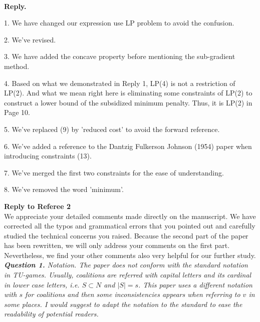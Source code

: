 \documentclass[11pt]{article}
\begin{document}
\\[2mm]

\noindent \textbf{Reply.}

1. We have changed our expression use LP problem to avoid the confusion.

2. We've revised.

3. We have added the concave property before mentioning the sub-gradient method.

4. Based on what we demonstrated in Reply 1, LP(4) is not a restriction of LP(2). And what we mean right here is eliminating some constraints of LP(2) to construct a lower bound of the subsidized minimum penalty. Thus, it is LP(2) in Page 10.

5. We've replaced (9) by 'reduced cost' to avoid the forward reference.

6. We've added a reference to the Dantzig Fulkerson Johnson (1954) paper when introducing constraints (13).

7. We've merged the first two constraints for the ease of understanding.

8. We've removed the word 'minimum'.
\\[4mm]

\newpage

\noindent \textbf{\large Reply to Referee 2}
\\[3mm]
We appreciate your detailed comments made directly on the manuscript.
We have corrected all the typos and grammatical errors that you pointed out and carefully studied the technical concerns you raised.
Because the second part of the paper has been rewritten, we will only address your comments on the first part.
Nevertheless, we find your other comments also very helpful for our further study.
\\[4mm]
%
%
%
%
\noindent \textit{\textbf{Question 1.}
Notation. The paper does not conform with the standard notation in
TU-games. Usually, coalitions are referred with capital letters and its
cardinal in lower case letters, i.e. $S \subset N$ and $|S| = s$. This paper uses a different notation with $s$ for coalitions and then some inconsistencies
appears when referring to $v$ in some places. I would suggest to adapt
the notation to the standard to ease the readability of potential readers.}
\end{document}
